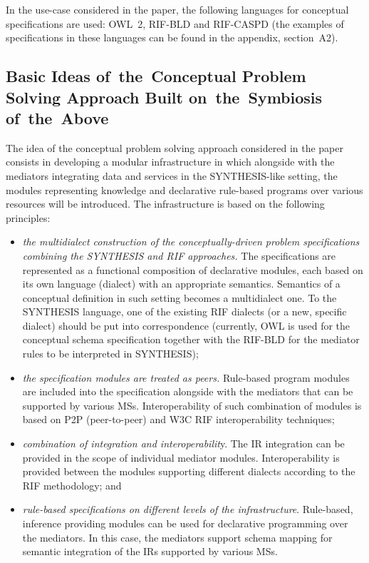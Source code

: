 \begin{multicols}{2}
  In the use-case considered in the paper, the following languages for conceptual
specifications are used: OWL~2, RIF-BLD and RIF-CASPD (the examples of
specifications in these languages can be found in the appendix, section~A2).

\subsection{Basic Ideas of~the~Conceptual Problem Solving Approach Built
on~the~Symbiosis of~the~Above}

  \noindent
  The idea of the conceptual problem solving approach considered in the paper
consists in developing a modular infrastructure in which alongside with the
mediators integrating data and services in the SYNTHESIS-like setting, the modules
representing knowledge and declarative rule-based programs over various resources
will be introduced. The infrastructure is based on the following principles:
  \begin{itemize}
\item \textit{the multidialect construction of the conceptually-driven problem
specifications   combining the SYNTHESIS and RIF approaches.} The specifications
are represented as a functional composition of declarative modules, each based on its
own language (dialect) with an appropriate semantics. Semantics of a conceptual
definition in such setting becomes a multidialect one. To the SYNTHESIS language,
one of the existing RIF dialects (or a new, specific dialect) should be put into
correspondence  (currently, OWL is used for the conceptual schema specification
together with the RIF-BLD for the mediator rules to be interpreted in SYNTHESIS);
\item \textit{the specification modules are treated as peers.} Rule-based program
modules are included into the specification alongside with the mediators that can be
supported by various MSs. Interoperability of such combination of modules is based
on P2P (peer-to-peer) and W3C RIF interoperability techniques;
\item \textit{combination of integration and interoperabilit}y. The
IR integration can be provided in the scope of individual mediator modules.
Interoperability is provided between the modules supporting different dialects
according to the RIF methodology; and
\item \textit{rule-based specifications on different levels of the infrastructure}.
Rule-based, inference providing modules can be used for declarative programming
over the mediators. In this case, the mediators support schema mapping for semantic
integration of the IRs supported by various MSs.
\end{itemize}





\end{multicols}
